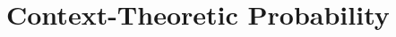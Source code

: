 \documentclass[11pt]{report}
\begin{document}



\section{Context-Theoretic Probability}

\end{document}
